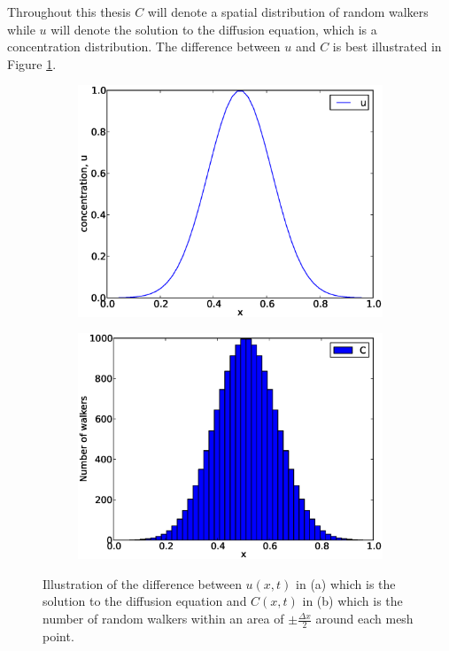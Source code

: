 \noindent Throughout this thesis $C$ will denote a spatial distribution of random walkers while $u$ will denote the solution to the diffusion equation, which is a concentration distribution. 
The difference between $u$ and $C$ is best illustrated in Figure \ref{theory:illustration_C}.

\begin{figure}[H]
 \centering
 \begin{subfigure}{0.48\textwidth}
  \includegraphics[width=\textwidth]{Figures/illustration_C_pt1.eps}
  \caption{}
 \end{subfigure}
 \begin{subfigure}{0.48\textwidth}
  \includegraphics[width=\textwidth]{Figures/illustration_C_pt2.eps}
  \caption{}
 \end{subfigure}
 \caption[Illustration of $C(x)$]{Illustration of the difference between $u(x,t)$ in (a) which is the solution to the diffusion equation and $C(x,t)$ in (b) which is the number of random walkers within an area of $\pm\frac{\Delta x}{2}$ around each mesh point.}
 \label{theory:illustration_C}
\end{figure}

